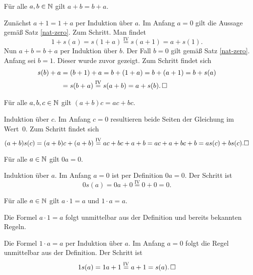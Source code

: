 \begin{Satz}\newlinefirst
Für alle $a,b\in\mathbb N$ gilt $a+b = b+a$.
\end{Satz}
\begin{Beweis}
Zunächst $a+1 = 1+a$ per Induktion über $a$. Im Anfang $a=0$ gilt
die Aussage gemäß Satz \ref{nat-zero}. Zum Schritt. Man findet
\[1+s(a) = s(1+a) \stackrel{\mathrm{IV}}= s(a+1) = a+s(1).\]
Nun $a+b=b+a$ per Induktion über $b$. Der Fall $b=0$
gilt gemäß Satz \ref{nat-zero}. Anfang sei $b=1$. Dieser
wurde zuvor gezeigt. Zum Schritt findet sich
\begin{align*}
s(b) + a &= (b+1)+a = b+(1+a) = b+(a+1) = b+s(a)\\
&= s(b+a)\stackrel{\mathrm{IV}}= s(a+b) = a+s(b).\,\Box
\end{align*}
\end{Beweis}

\begin{Satz}\newlinefirst
Für alle $a,b,c\in\mathbb N$ gilt $(a+b)c = ac+bc$.
\end{Satz}
\begin{Beweis} Induktion über $c$. Im Anfang $c=0$ resultieren
beide Seiten der Gleichung im Wert~$0$. Zum Schritt findet sich
\[(a+b)s(c) = (a+b)c+(a+b) \stackrel{\mathrm{IV}}= ac+bc+a+b = ac+a+bc+b
= as(c) + bs(c).\Box\]
\end{Beweis}

\begin{Satz}\label{nat-mul-zero}
Für alle $a\in\mathbb N$ gilt $0a=0$.
\end{Satz}
\begin{Beweis}
Induktion über $a$. Im Anfang $a=0$ ist per Definition $0a=0$.
Der Schritt ist
\[0s(a) = 0a+0 \stackrel{\mathrm{IV}}= 0+0 = 0.\]
\end{Beweis}

\begin{Satz}%
\label{nat-mul-one}\newlinefirst
Für alle $a\in\mathbb N$ gilt $a\cdot 1=a$ und $1\cdot a=a$.
\end{Satz}
\begin{Beweis}
Die Formel $a\cdot 1 = a$ folgt unmittelbar aus der Definition
und bereits bekannten Regeln.

Die Formel $1\cdot a = a$ per Induktion über $a$. Im Anfang $a=0$ folgt
die Regel unmittelbar aus der Definition. Der Schritt ist
\[1s(a) = 1a+1 \stackrel{\mathrm{IV}}= a+1 = s(a).\,\Box\]
\end{Beweis}

